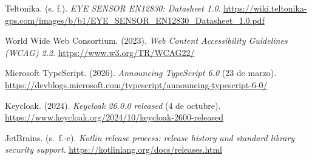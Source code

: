 \begin{list}{}{\setlength{\leftmargin}{1.27cm}\setlength{\itemindent}{-1.27cm}\setlength{\itemsep}{0.5\baselineskip}\raggedright}
\item Teltonika. (s. f.). \textit{EYE SENSOR EN12830: Datasheet 1.0}. \url{https://wiki.teltonika-gps.com/images/b/b1/EYE_SENSOR_EN12830_Datasheet_1.0.pdf}
\item World Wide Web Consortium. (2023). \textit{Web Content Accessibility Guidelines (WCAG) 2.2}. \url{https://www.w3.org/TR/WCAG22/}
\item Microsoft TypeScript. (2026). \textit{Announcing TypeScript 6.0} (23 de marzo). \url{https://devblogs.microsoft.com/typescript/announcing-typescript-6-0/}
\item Keycloak. (2024). \textit{Keycloak 26.0.0 released} (4 de octubre). \url{https://www.keycloak.org/2024/10/keycloak-2600-released}
\item JetBrains. (s.~f.-c). \textit{Kotlin release process: release history and standard library security support}. \url{https://kotlinlang.org/docs/releases.html}
\end{list}
\clearpage